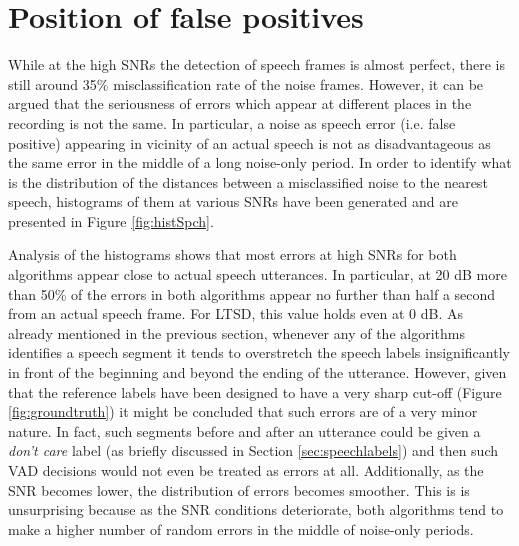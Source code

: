 \section{Position of false positives}

While at the high SNRs the detection of speech frames is almost perfect, there is still around 35\% misclassification rate of the noise frames. However, it can be argued that the seriousness of errors which appear at different places in the recording is not the same. In particular, a noise as speech error (i.e. false positive) appearing in vicinity of an actual speech is not as disadvantageous as the same error in the middle of a long noise-only period. In order to identify what is the distribution of the distances between a misclassified noise to the nearest speech, histograms of them at various SNRs have been generated and are presented in Figure \ref{fig:histSpch}.

Analysis of the histograms shows that most errors at high SNRs for both algorithms appear close to actual speech utterances. In particular, at 20 dB more than 50\% of the errors in both algorithms appear no further than half a second from an actual speech frame. For LTSD, this value holds even at 0 dB. As already mentioned in the previous section, whenever any of the algorithms identifies a speech segment it tends to overstretch the speech labels insignificantly in front of the beginning and beyond the ending of the utterance. However, given that the reference labels have been designed to have a very sharp cut-off (Figure \ref{fig:groundtruth}) it might be concluded that such errors are of a very minor nature. In fact, such segments before and after an utterance could be given a \emph{don't care} label (as briefly discussed in Section \ref{sec:speechlabels}) and then such VAD decisions would not even be treated as errors at all. Additionally, as the SNR becomes lower, the distribution of errors becomes smoother. This is is unsurprising because as the SNR conditions deteriorate, both algorithms tend to make a higher number of random errors in the middle of noise-only periods.

